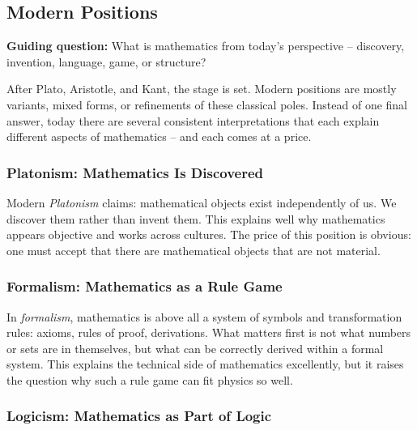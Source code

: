 
\subsection{Modern Positions}
\label{sec:8.4}

\textbf{Guiding question:} What is mathematics from today's perspective -- discovery, invention, language, game, or structure?

\medskip

After Plato,
Aristotle, and Kant, the stage is set.
Modern positions are mostly variants,
mixed forms, or refinements of these classical poles.
Instead of one final answer,
today there are several consistent interpretations
that each explain different aspects of mathematics --
and each comes at a price.

\subsubsection*{Platonism: Mathematics Is Discovered}

Modern \emph{Platonism} claims:
mathematical objects exist independently of us.
We discover them
rather than invent them.
This explains well
why mathematics appears objective
and works across cultures.
The price of this position is obvious:
one must accept
that there are mathematical objects
that are not material.

\subsubsection*{Formalism: Mathematics as a Rule Game}

In \emph{formalism}, mathematics is above all a system of symbols and transformation rules:
axioms,
rules of proof,
derivations.
What matters first is not
what numbers or sets are in themselves,
but what can be correctly derived within a formal system.
This explains the technical side of mathematics excellently,
but it raises the question
why such a rule game can fit physics so well.

\subsubsection*{Logicism: Mathematics as Part of Logic}


